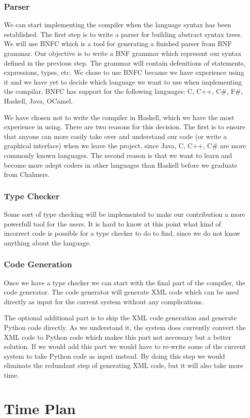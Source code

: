 \documentclass[a4paper]{article}
\begin{document}
\subsubsection{Parser}
We can start implementing the compiler when the language syntax has
been established. The first step is to write a parser for building
abstract syntax trees. We will use BNFC which is a tool for generating
a finished parser from BNF grammar. Our objective is to write a BNF
grammar which represent our syntax defined in the previous step. The
grammar will contain defenitions of statements, expressions, types,
etc. We chose to use BNFC because we have experience using it and we
have yet to decide which language we want to use when implementing the
compilar. BNFC has support for the following languages: C, C++, C#,
F#, Haskell, Java, OCamel.

We have chosen not to write the compiler in Haskell, which we have the
most experience in using. There are two reasons for this decision. The
first is to ensure that anyone can more easily take over and
understand our code (or write a graphical interface) when we leave the
project, since Java, C, C++, C# are more commonly known languages. The
second reason is that we want to learn and become more adept coders in
other languages than Haskell before we graduate from Chalmers.

\subsubsection{Type Checker}
Some sort of type checking will be implemented to make our
contribution a more powerfull tool for the users. It is hard to know
at this point what kind of incorrect code is possible for a type
checker to do to find, since we do not know anything about the
language.

\subsubsection{Code Generation}
Once we have a type checker we can start with the final part of the
compiler, the code generator. The code generator will generate XML
code which can be used directly as input for the current system
without any complications.

The optional additional part is to skip the XML code generation and
generate Python code directly. As we understand it, the system does
currently convert the XML code to Python code which makes this part
not necessary but a better solution. If we would add this part we
would have to re-write some of the current system to take Python code
as input instead. By doing this step we would eliminate the redundant
step of generating XML code, but it will also take more time.


\section{Time Plan}
\end{document}
